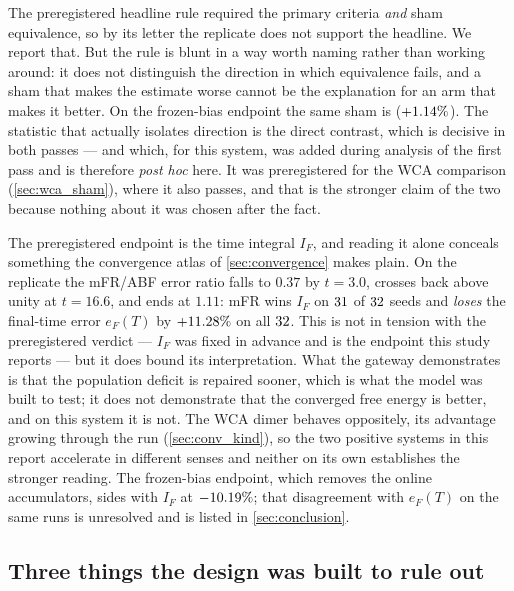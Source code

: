 \begin{remark}
The preregistered headline rule required the primary criteria \emph{and} sham equivalence, so
by its letter the replicate does not support the headline. We report that. But the rule is
blunt in a way worth naming rather than working around: it does not distinguish the direction
in which equivalence fails, and a sham that makes the estimate worse cannot be the explanation
for an arm that makes it better. On the frozen-bias endpoint the same sham is \GwrShamFrozenTost{}
($+1.14\%$). The statistic that actually isolates direction is the direct contrast,
which is decisive in both passes --- and which, for this system, was added during analysis of
the first pass and is therefore \emph{post hoc} here. It was preregistered for the WCA
comparison (\cref{sec:wca_sham}), where it also passes, and that is the stronger claim of the
two because nothing about it was chosen after the fact.
\end{remark}

\begin{remark}
\label{rem:gw_reversal}
The preregistered endpoint is the time integral $I_F$, and reading it alone conceals something
the convergence atlas of \cref{sec:convergence} makes plain. On the replicate the mFR/ABF
error ratio falls to $0.37$ by $t=3.0$, crosses back above unity at $t=16.6$, and ends at
$1.11$: mFR wins $I_F$ on $31$ of $32$ seeds and \emph{loses} the final-time
error $e_F(T)$ by $+11.28\%$ on all $32$. This is not in tension with the
preregistered verdict --- $I_F$ was fixed in advance and is the endpoint this study reports ---
but it does bound its interpretation. What the gateway demonstrates is that the population
deficit is repaired sooner, which is what the model was built to test; it does not
demonstrate that the converged free energy is better, and on this system it is not. The WCA
dimer behaves oppositely, its advantage growing through the run
(\cref{sec:conv_kind}), so the two positive systems in this report accelerate in different
senses and neither on its own establishes the stronger reading. The frozen-bias endpoint,
which removes the online accumulators, sides with $I_F$ at $-10.19\%$; that disagreement
with $e_F(T)$ on the same runs is unresolved and is listed in \cref{sec:conclusion}.
\end{remark}

\subsection{Three things the design was built to rule out}
